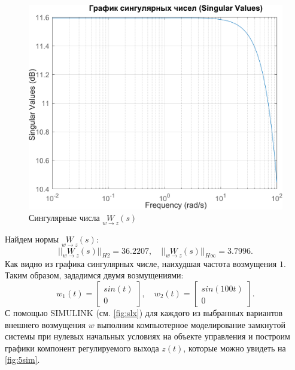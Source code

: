 \begin{figure}[H]
    \centering
    \includegraphics[width=0.8\linewidth]{figs/5_sigma.png}
    \caption{Сингулярные числа $\underset{w\rightarrow z}{W}(s)$}
    \label{fig:5sigma}
\end{figure}
\noindent Найдем нормы $\underset{w\rightarrow z}{W}(s)$:
\begin{equation*}
    ||\underset{w\rightarrow z}{W}(s)||_{H2}=36.2207,\quad
    ||\underset{w\rightarrow z}{W}(s)||_{H\infty}=3.7996.
\end{equation*}
Как видно из графика сингулярных числе, наихудшая частота возмущения $1$.
Таким образом, зададимся двумя возмущениями:
\begin{equation*}
    w_1(t)=\begin{bmatrix}
        sin(t)\\
        0
    \end{bmatrix},\quad
    w_2(t)=\begin{bmatrix}
        sin(100t)\\
        0
    \end{bmatrix}.
\end{equation*}
С помощью SIMULINK (см. \autoref{fig:slx}) для каждого из выбранных вариантов внешнего возмущения $w$ выполним 
компьютерное моделирование замкнутой системы при нулевых начальных условиях
на объекте управления и построим графики компонент регулируемого выхода
$z(t)$, которые можно увидеть на \autoref{fig:5sim}.
